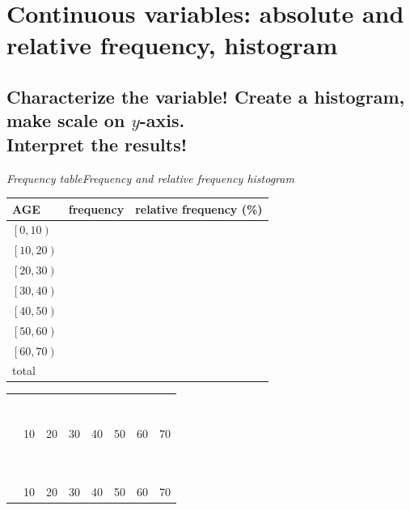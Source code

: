 
\section{Continuous variables: absolute and relative frequency, histogram}
\subsection{Characterize the  variable! Create a histogram, make scale on $y$-axis.\\ Interpret the results!}




	\noindent\emph{Frequency table}\hfill\emph{Frequency and relative frequency histogram}
	
	\begin{center}
		\begin{tabular}{l|l|l}
		\toprule
		AGE		& frequency	& relative frequency (\%)\\
		\midrule		
	$\left[0,10\right)$&&\\
	$\left[10,20\right)$&&\\
	$\left[20,30\right)$&&\\
	$\left[30,40\right)$&&\\
	$\left[40,50\right)$&&\\
	$\left[50,60\right)$&&\\
	$\left[60,70\right)$&&\\
		\midrule
		total&&\\
		\bottomrule
		\end{tabular}
%
\hfill
\footnotesize
	\begin{tabular}{|llllllll}
		&&\\\\\\\\\\\\\\
		\hline
		\multicolumn{1}{l}{}& 10 & 20 & 30 & 40 & 50 & 60 & 70
\\
\\
\\
		&&\\\\\\\\\\\\\\
		\hline
		\multicolumn{1}{l}{}& 10 & 20 & 30 & 40 & 50 & 60 & 70
		\end{tabular}
	\end{center}

